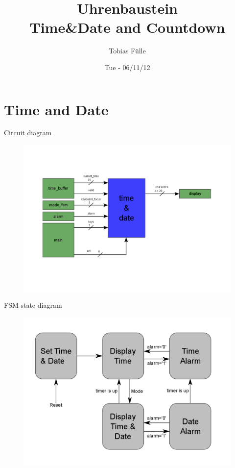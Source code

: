 \documentclass{beamer}
\title[Title of presentation]{Uhrenbaustein\\
{\small Time&Date and Countdown}
}
\author[author name]
{Tobias F{\"u}lle}
\institute[Fnord GmbH]{Lehrstuhl f{\"u}r integrierte Systeme}
\date{Tue - 06/11/12}
\begin{document}
%

\section{Time and Date}



  \begin{frame}{Circuit diagram}  
  	\begin{figure}
  		\centering
  		\includegraphics[scale=0.35]{./pictures/Zeichnung.png}
  	\end{figure}
  \end{frame}

  \begin{frame}{FSM  state diagram}
  	\begin{figure}
    	\includegraphics[scale=0.25]{./pictures/Tdsd.png}
    \end{figure}
  \end{frame}
\end{document}
